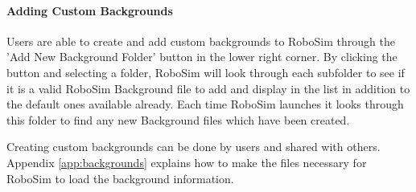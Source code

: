 \documentclass{article}
\begin{document}
\paragraph{Adding Custom Backgrounds}
Users are able to create and add custom backgrounds to RoboSim through the 'Add
New Background Folder' button in the lower right corner.  By clicking the button
and selecting a folder, RoboSim will look through each subfolder to see if it is
a valid RoboSim Background file to add and display in the list in addition to
the default ones available already.  Each time RoboSim launches it looks through
this folder to find any new Background files which have been created.

Creating custom backgrounds can be done by users and shared with others.
Appendix \ref{app:backgrounds} explains how to make the files necessary for
RoboSim to load the background information.
\end{document}
